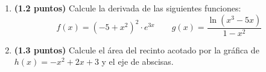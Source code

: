 
\begin{enumerate}[label=\alph*)]
  \item \textbf{(1.2 puntos)} Calcule la derivada de las siguientes funciones:
  \[
  f(x)=(-5+x^2)^2\cdot e^{3x}\qquad
  g(x)=\frac{\ln(x^3-5x)}{1-x^2}
  \]
  \item \textbf{(1.3 puntos)} Calcule el área del recinto acotado por la
  gráfica de $h(x)=-x^2+2x+3$ y el eje de abscisas.
\end{enumerate}

